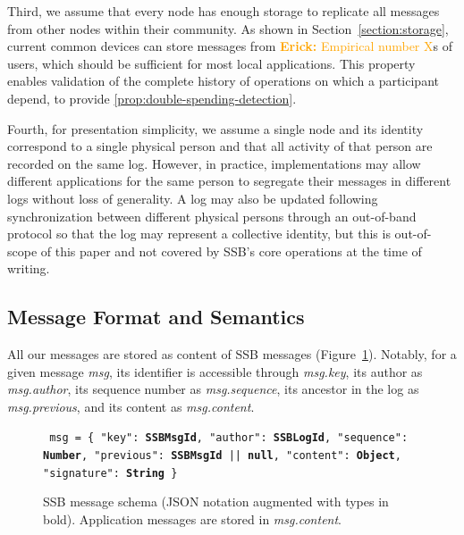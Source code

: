 \documentclass[sigplan,screen,10pt]{acmart}
\newcommand\el[1]{\textcolor{orange}{{\bf Erick: }#1}}
\begin{document}
Third, we assume that every node has enough storage to replicate all messages from other nodes within their community. As shown in Section~\ref{section:storage}, current common devices can store messages from \el{Empirical number X}s of users, which should be sufficient for most local applications. This property enables validation of the complete history of operations on which a participant depend, to provide \ref{prop:double-spending-detection}.

Fourth, for presentation simplicity, we assume a single node and its identity correspond to a single physical person and that all activity of that person are recorded on the same log. However, in practice, implementations may allow different applications for the same person to segregate their messages in different logs without loss of generality. A log may also be updated following synchronization between different physical persons through an out-of-band protocol so that the log may represent a collective identity,  but this is out-of-scope of this paper and not covered by SSB's core operations at the time of writing.

\subsection{Message Format and Semantics}



All our messages are stored as content of SSB messages (Figure~\ref{fig:ssb-message-schema}). Notably, for a given message \textit{msg}, its identifier is accessible through \textit{msg.key}, its author as \textit{msg.author}, its sequence number as \textit{msg.sequence}, its ancestor in the log as \textit{msg.previous}, and its content as \textit{msg.content}.


\begin{figure}[ht]
\flushleft
\texttt{ msg = \{ 
     "key": \textbf{SSBMsgId},
     "author": \textbf{SSBLogId}, 
     "sequence": \textbf{Number}, 
     "previous": \textbf{SSBMsgId} || \textbf{null},  
     "content": \textbf{Object},
     "signature": \textbf{String}
\} 
     }
\caption[]{SSB message schema (JSON notation augmented with types in bold). Application messages are stored in \textit{msg.content}.\footnotemark }
\label{fig:ssb-message-schema}
\end{figure}
\end{document}
